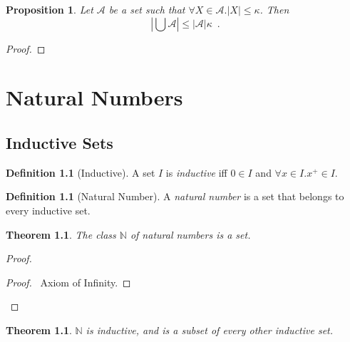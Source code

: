 \documentclass{book}
\let\qed\relax
\newtheorem{prop}[ax]{Proposition}
\newtheorem{thm}[ax]{Theorem}
\theoremstyle{definition}
\newtheorem{df}[ax]{Definition}
\begin{document}
\begin{prop}
\label{prop:unioncard}
Let $\mathcal{A}$ be a set such that $\forall X \in \mathcal{A}. |X| \leq \kappa$. Then
\[ \left| \bigcup \mathcal{A} \right| \leq |\mathcal{A}| \kappa \enspace . \]
\end{prop}

\begin{proof}
\pf
{}
\qed
\end{proof}

\chapter{Natural Numbers}

\section{Inductive Sets}

\begin{df}[Inductive]
A set $I$ is \emph{inductive} iff $0 \in I$ and $\forall x \in I. x^+ \in I$.
\end{df}

\begin{df}[Natural Number]
A \emph{natural number} is a set that belongs to every inductive set.
\end{df}

\begin{thm}
The class $\mathbb{N}$ of natural numbers is a set.
\end{thm}

\begin{proof}
\pf
{}
\begin{proof}
	\pf\ Axiom of Infinity.
\end{proof}
\qed
\end{proof}

\begin{thm}
$\mathbb{N}$ is inductive, and is a subset of every other inductive set.
\end{thm}
\end{document}
